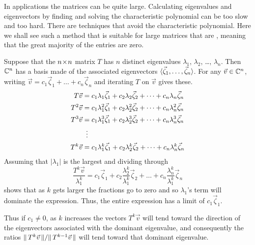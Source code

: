 In applications the matrices can be quite large.
Calculating eigenvalues and eigenvectors by
finding and solving the characteristic polynomial
can be too slow and too hard. 
There are techniques that avoid the characteristic polynomial. 
Here we shall see such a method that is suitable for large matrices that are
, 
meaning that the great majority of the entries are zero.

Suppose that the $n \! \times \! n$ matrix $T$ has $n$ distinct eigenvalues
$\lambda_1$, $\lambda_2$, \ldots, $\lambda_n$.
Then $\mathbb{C}^n$ has a basis made of the associated eigenvectors
$\langle\vec{\zeta}_1,\dots,\vec{\zeta}_n\rangle$.
For any $\vec{v}\in\mathbb{C}^n$, writing
$\vec{v}=c_1\vec{\zeta}_1+\dots+c_n\vec{\zeta}_n$ and iterating $T$ on $\vec{v}$
gives these.
\begin{align*}
  T\vec{v} 
      &=c_1\lambda_1\vec{\zeta}_1+c_2\lambda_2\vec{\zeta}_2+
                              \dots+c_n\lambda_n\vec{\zeta}_n  \\
  T^2\vec{v} 
      &=c_1\lambda_1^2\vec{\zeta}_1+c_2\lambda_2^2\vec{\zeta}_2+
                              \dots+c_n\lambda_n^2\vec{\zeta}_n  \\
  T^3\vec{v} 
      &=c_1\lambda_1^3\vec{\zeta}_1+c_2\lambda_2^3\vec{\zeta}_2+
                              \dots+c_n\lambda_n^3\vec{\zeta}_n  \\
      &\vdotswithin{=}                                            \\
  T^k\vec{v} 
      &=c_1\lambda_1^k\vec{\zeta}_1+c_2\lambda_2^k\vec{\zeta}_2+
                              \dots+c_n\lambda_n^k\vec{\zeta}_n  
\end{align*}
Assuming that $|\lambda_1|$
is the largest and dividing through
\begin{equation*}
  \frac{T^k\vec{v}}{\lambda_1^k} 
      =c_1\vec{\zeta}_1+c_2\frac{\lambda_2^k}{\lambda_1^k}\vec{\zeta}_2+
                    \dots+c_n\frac{\lambda_n^k}{\lambda_1^k}\vec{\zeta}_n  
\end{equation*} 
shows that as $k$ gets larger the fractions go to zero
and so $\lambda_1$'s term will dominate the expression.
Thus, the entire expression has a limit of $c_1\vec{\zeta}_1$.

Thus if $c_1\neq 0$, 
as $k$ increases the vectors $T^k\vec{v}$ will tend toward the direction of 
the eigenvectors associated with the dominant eigenvalue,
and consequently
the ratios $\|\,T^{k}\vec{v}\,\|/\|\,T^{k-1}\vec{v}\,\|$ 
will tend toward that dominant eigenvalue.

